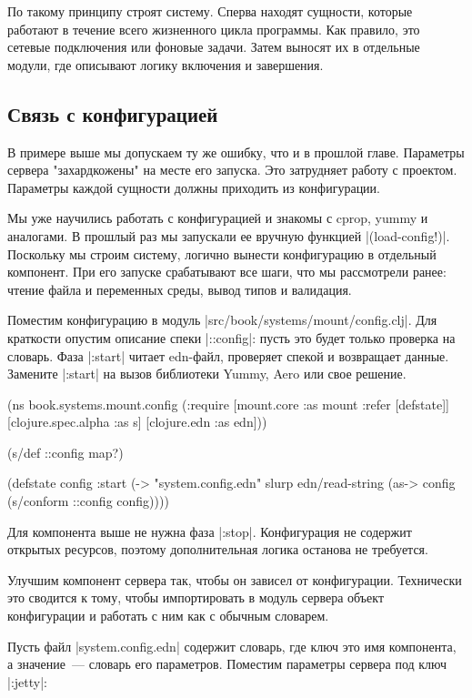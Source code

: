 По такому принципу строят систему. Сперва находят сущности, которые работают в
течение всего жизненного цикла программы. Как правило, это сетевые подключения
или фоновые задачи. Затем выносят их в отдельные модули, где описывают логику
включения и завершения.

\subsection{Связь с конфигурацией}

В примере выше мы допускаем ту же ошибку, что и в прошлой главе. Параметры
сервера "захардкожены" на месте его запуска. Это затрудняет работу с
проектом. Параметры каждой сущности должны приходить из конфигурации.

Мы уже научились работать с конфигурацией и знакомы с cprop, yummy и
аналогами. В прошлый раз мы запускали ее вручную функцией
\spverb|(load-config!)|. Поскольку мы строим систему, логично вынести конфигурацию в
отдельный компонент. При его запуске срабатывают все шаги, что мы рассмотрели
ранее: чтение файла и переменных среды, вывод типов и валидация.

Поместим конфигурацию в модуль \spverb|src/book/systems/mount/config.clj|. Для
краткости опустим описание спеки \spverb|::config|: пусть это будет только проверка на
словарь. Фаза \spverb|:start| читает edn-файл, проверяет спекой и возвращает
данные. Замените \spverb|:start| на вызов библиотеки Yummy, Aero или свое решение.

\begin{code}
(ns book.systems.mount.config
  (:require
   [mount.core :as mount :refer [defstate]]
   [clojure.spec.alpha :as s]
   [clojure.edn :as edn]))

(s/def ::config map?)

(defstate config
  :start
  (-> "system.config.edn"
      slurp
      edn/read-string
      (as-> config
          (s/conform ::config config))))
\end{code}

Для компонента выше не нужна фаза \spverb|:stop|. Конфигурация не содержит открытых
ресурсов, поэтому дополнительная логика останова не требуется.

Улучшим компонент сервера так, чтобы он зависел от конфигурации. Технически это
сводится к тому, чтобы импортировать в модуль сервера объект конфигурации и
работать с ним как с обычным словарем.

Пусть файл \spverb|system.config.edn| содержит словарь, где ключ это имя компонента, а
значение~--- словарь его параметров. Поместим параметры сервера под ключ \spverb|:jetty|:

